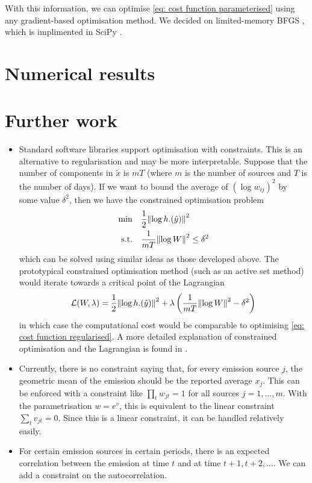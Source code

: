 \documentclass{article}
\begin{document}
With this information, we can optimise \cref{eq: cost function parameterised} using any gradient-based optimisation method. We decided on limited-memory BFGS \cite{Nocedal2006}, which is implimented in SciPy \cite{virtanen2020scipy}.

\section{Numerical results}
\label{sec: numerical results}

\section{Further work}
\label{sec: further work}
\begin{itemize}
    \item Standard software libraries support optimisation with constraints. This is an alternative to regularisation and may be more interpretable.
    Suppose that the number of components in $\tilde{x}$ is $m T$ (where $m$ is the number of sources and $T$ is the number of days).
    If we want to bound the average of $(\log w_{ij})^2$ by some value $\delta^2$, then we have the constrained optimisation problem
    \begin{align*}
        \min\quad & \frac{1}{2} \norm{\log h.(\hat{y})}^2 \\
        \text{s.t.}\quad & \frac{1}{mT} \norm{\log W}^2 \le \delta^2
    \end{align*} 
    which can be solved using similar ideas as those developed above. The prototypical constrained optimisation method (such as an active set method) would iterate towards a critical point of the Lagrangian
    $$
    \mathcal{L}(W, \lambda) = \frac{1}{2} \norm{\log h.(\hat{y})}^2 + \lambda\left(\frac{1}{mT} \norm{\log W}^2 - \delta^2\right)
    $$
    in which case the computational cost would be comparable to optimising \cref{eq: cost function regularised}. A more detailed explanation of constrained optimisation and the Lagrangian is found in \cite{Nocedal2006}.
    \item Currently, there is no constraint saying that, for every emission source $j$, the geometric mean of the emission should be the reported average $x_j$. This can be enforced with a constraint like $\prod_{t} w_{jt} = 1$ for all sources $j=1,\dots,m$. With the parametrisation $w = e^v$, this is equivalent to the linear constraint $\sum_{t} v_{jt} = 0$. Since this is a linear constraint, it can be handled relatively easily.
    \item For certain emission sources in certain periods, there is an expected correlation between the emission at time $t$ and at time $t + 1, t + 2, \dots$. We can add a constraint on the autocorrelation.

\end{itemize}
\end{document}
